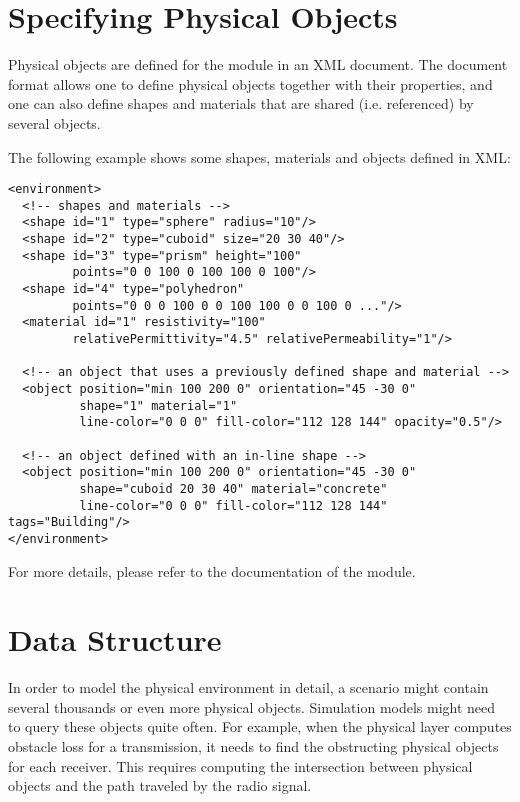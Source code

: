 \section{Specifying Physical Objects}

Physical objects are defined for the  module
in an XML document. The document format allows one to define physical objects
together with their properties, and one can also define shapes and materials
that are shared (i.e. referenced) by several objects.

The following example shows some shapes, materials and objects defined in XML:

\begin{verbatim}
<environment>
  <!-- shapes and materials -->
  <shape id="1" type="sphere" radius="10"/>
  <shape id="2" type="cuboid" size="20 30 40"/>
  <shape id="3" type="prism" height="100"
         points="0 0 100 0 100 100 0 100"/>
  <shape id="4" type="polyhedron"
         points="0 0 0 100 0 0 100 100 0 0 100 0 ..."/>
  <material id="1" resistivity="100"
         relativePermittivity="4.5" relativePermeability="1"/>

  <!-- an object that uses a previously defined shape and material -->
  <object position="min 100 200 0" orientation="45 -30 0"
          shape="1" material="1"
          line-color="0 0 0" fill-color="112 128 144" opacity="0.5"/>

  <!-- an object defined with an in-line shape -->
  <object position="min 100 200 0" orientation="45 -30 0"
          shape="cuboid 20 30 40" material="concrete"
          line-color="0 0 0" fill-color="112 128 144" tags="Building"/>
</environment>
\end{verbatim}

For more details, please refer to the documentation of the
 module.

\section{Data Structure}

In order to model the physical environment in detail, a scenario might contain
several thousands or even more physical objects. Simulation models might
need to query these objects quite often. For example, when the physical layer
computes obstacle loss for a transmission, it needs to find the obstructing
physical objects for each receiver. This requires computing the intersection
between physical objects and the path traveled by the radio signal.

